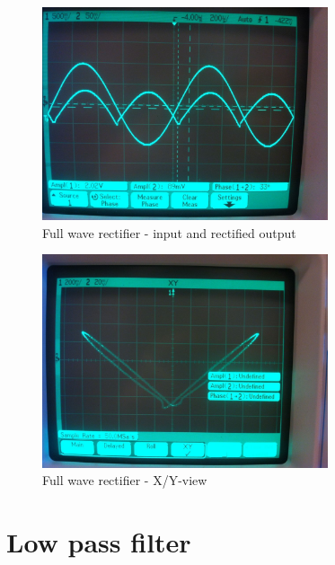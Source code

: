 \documentclass[11pt,a4paper]{article}
\begin{document}
\begin{figure}[htbp]
    \centering
    \includegraphics[width=0.75\textwidth]{img/fwr1.jpg}
    \caption{Full wave rectifier - input and rectified output}
    \label{fig:fwr1_scope}
\end{figure}

\begin{figure}[htbp]
    \centering
    \includegraphics[width=0.75\textwidth]{img/fwr2.jpg}
    \caption{Full wave rectifier - X/Y-view}
    \label{fig:fwr2_scope}
\end{figure}


\section{Low pass filter}\label{lowpass-filter}
\end{document}

